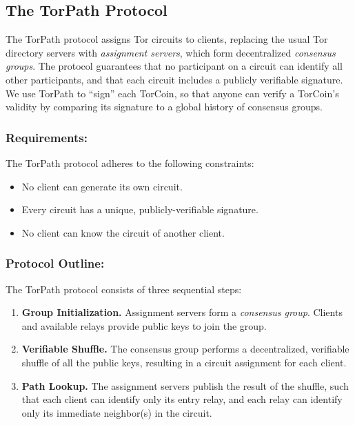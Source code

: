 \subsection{The TorPath Protocol}

The TorPath protocol assigns Tor circuits to clients, replacing the usual Tor
directory servers with \textit{assignment servers}, which form decentralized
\textit{consensus groups}. The protocol guarantees that no participant on a 
circuit can identify all other participants, and that each circuit includes a 
publicly verifiable signature. We use TorPath to ``sign'' each TorCoin, so that 
anyone can verify a TorCoin's validity by comparing its signature to a global
history of consensus groups.

\subsubsection{Requirements:}
The TorPath protocol adheres to the following constraints:

\begin{itemize}   
\item No client can generate its own circuit.
\item Every circuit has a unique, publicly-verifiable signature.
\item No client can know the circuit of another client.
\end{itemize}

\subsubsection{Protocol Outline:}

The TorPath protocol consists of three sequential steps:

\begin{enumerate}
\item \textbf{Group Initialization.} Assignment servers form a \textit{consensus 
group}. Clients and available relays provide public keys to join the group.

\item \textbf{Verifiable Shuffle.} The consensus group performs a decentralized, 
verifiable shuffle of all the public keys, resulting in a circuit assignment for
each client.

\item \textbf{Path Lookup.} The assignment servers publish the result of the 
shuffle, such that each client can identify only its entry relay, and each 
relay can identify only its immediate neighbor(s) in the circuit.
\end{enumerate}

